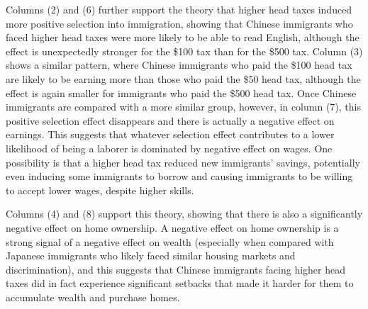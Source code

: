 Columns (2) and (6) further support the theory that higher head taxes induced more positive selection into immigration, showing that Chinese immigrants who faced higher head taxes were more likely to be able to read English, although the effect is unexpectedly stronger for the \$100 tax than for the \$500 tax. Column (3) shows a similar pattern, where Chinese immigrants who paid the \$100 head tax are likely to be earning more than those who paid the \$50 head tax, although the effect is again smaller for immigrants who paid the \$500 head tax. Once Chinese immigrants are compared with a more similar group, however, in column (7), this positive selection effect disappears and there is actually a negative effect on earnings. This suggests that whatever selection effect contributes to a lower likelihood of being a laborer is dominated by negative effect on wages. 
One possibility is that a higher head tax reduced new immigrants' savings, potentially even inducing some immigrants to borrow and causing immigrants to be willing to accept lower wages, despite higher skills.

Columns (4) and (8) support this theory, showing that there is also a significantly negative effect on home ownership. A negative effect on home ownership is a strong signal of a negative effect on wealth (especially when compared with Japanese immigrants who likely faced similar housing markets and discrimination), and this suggests that Chinese immigrants facing higher head taxes did in fact experience significant setbacks that made it harder for them to accumulate wealth and purchase homes.
